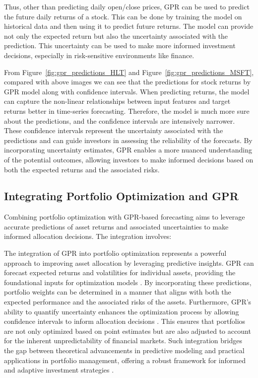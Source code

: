 Thus, other than predicting daily open/close prices, GPR can be used to predict the future daily returns of a stock. This can be done by training the model on historical data and then using it to predict future returns. The model can provide not only the expected return but also the uncertainty associated with the prediction. This uncertainty can be used to make more informed investment decisions, especially in risk-sensitive environments like finance.

From Figure~\ref{fig:gpr_predictions_HLT} and Figure~\ref{fig:gpr_predictions_MSFT}, compared with above images we can see that the predictions for stock returns by GPR model along with confidence intervals. When predicting returns, the model can capture the non-linear relationships between input features and target returns better in time-series forecasting. Therefore, the model is much more sure about the predictions, and the confidence intervals are intensively narrower.
These confidence intervals represent the uncertainty associated with the predictions and can guide investors in assessing the reliability of the forecasts. By incorporating uncertainty estimates, GPR enables a more nuanced understanding of the potential outcomes, allowing investors to make informed decisions based on both the expected returns and the associated risks.
\subsection{Integrating Portfolio Optimization and \ac{GPR}}

Combining portfolio optimization with GPR-based forecasting aims to leverage accurate predictions of asset returns and associated uncertainties to make informed allocation decisions. The integration involves:

The integration of GPR into portfolio optimization represents a powerful approach to improving asset allocation by leveraging predictive insights. 
GPR can forecast expected returns and volatilities for individual assets, providing the foundational inputs for optimization models \cite{deisenroth2015gaussian, cont2001empirical}. 
By incorporating these predictions, portfolio weights can be determined in a manner that aligns with both the expected performance and the associated risks of the assets. Furthermore, GPR's ability to quantify uncertainty enhances the optimization process by allowing confidence intervals to inform allocation decisions \cite{asmussen2007stochastic}. 
This ensures that portfolios are not only optimized based on point estimates but are also adjusted to account for the inherent unpredictability of financial markets. 
Such integration bridges the gap between theoretical advancements in predictive modeling and practical applications in portfolio management, offering a robust framework for informed and adaptive investment strategies \cite{markowitz1952portfolio}.
